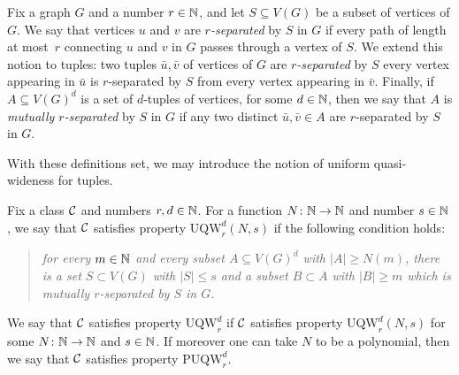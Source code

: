 Fix a graph $G$ and a number $r\in \N$, and let $S\subseteq V(G)$ be a subset of vertices of $G$.
We say that vertices $u$ and $v$ are {\em{$r$-separated}} by $S$ in $G$ if every path of length at most~$r$ connecting $u$ and $v$ in $G$ passes through a vertex of $S$.
We extend this notion to tuples:
two tuples $\bar u,\bar v$ of vertices of $G$ are \emph{$r$-separated} by $S$ every vertex appearing in $\bar u$ is $r$-separated by $S$ from every vertex appearing in $\bar{v}$.
Finally, if $A\subseteq V(G)^d$ is a set of $d$-tuples of vertices, for some $d\in\N$,
then we say that $A$ is \emph{mutually $r$-separated} by $S$ in $G$ 
if any two distinct $\bar u,\bar v\in A$ are $r$-separated by $S$ in $G$.

\newcommand{\uqw}{\mathrm{UQW}}
\newcommand{\puqw}{\mathrm{PUQW}}
With these definitions set, we may introduce the notion of uniform quasi-wideness for tuples.

\begin{definition}
Fix a class $\cal C$ and numbers $r,d\in\N$.
For a function $N\from\N\to\N$
and number $s\in\N$,
we say that $\cal C$ satisfies property
$\uqw^d_r(N,s)$ if the following condition holds:
   \begin{quote}\itshape 
      for every $m\in \N$ and every subset 
     $A\subseteq V(G)^d$ with $|A|\ge N(m)$, there is a set $S\subset V(G)$ with $|S|\le s$ and a subset $B\subset A$ with $|B|\ge m$ which is mutually $r$-separated by $S$ in $G$.
   \end{quote}   
    We say that $\cal C$ satisfies property $\uqw^d_r$ if  $\cal C$ satisfies property $\uqw^d_r(N,s)$ for 
	some $N\from\N\to\N$ and $s\in\N$.
	If moreover one can take $N$ to be a polynomial,
	then we say that $\cal C$ satisfies property $\puqw^d_r$.
\end{definition}

  
